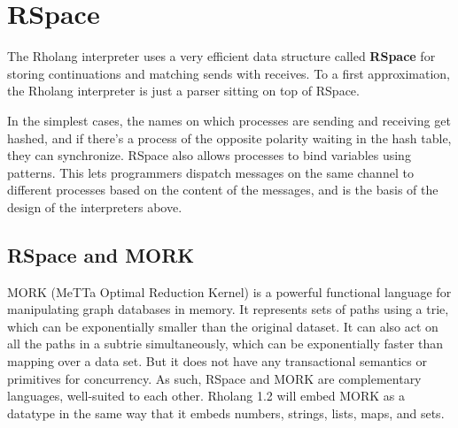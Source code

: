 \documentclass{article}
\begin{document}
\section{RSpace}

The Rholang interpreter uses a very efficient data structure called \textbf{RSpace} for storing continuations and matching sends with receives.  To a first approximation, the Rholang interpreter is just a parser sitting on top of RSpace.

In the simplest cases, the names on which processes are sending and receiving get hashed, and if there's a process of the opposite polarity waiting in the hash table, they can synchronize.  RSpace also allows processes to bind variables using patterns.  This lets programmers dispatch messages on the same channel to different processes based on the content of the messages, and is the basis of the design of the interpreters above.

\subsection{RSpace and MORK}

MORK (MeTTa Optimal Reduction Kernel) is a powerful functional language for manipulating graph databases in memory. It represents sets of paths using a trie, which can be exponentially smaller than the original dataset.  It can also act on all the paths in a subtrie simultaneously, which can be exponentially faster than mapping over a data set.  But it does not have any transactional semantics or primitives for concurrency.  As such, RSpace and MORK are complementary languages, well-suited to each other.  Rholang 1.2 will embed MORK as a datatype in the same way that it embeds numbers, strings, lists, maps, and sets.  
\end{document}
